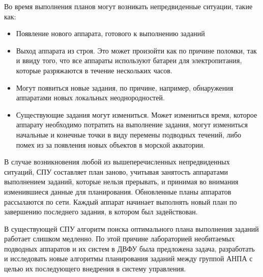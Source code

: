 \documentclass[a4paper,14pt,russian]{article}
\begin{document}
Во время выполнения планов могут возникать непредвиденные ситуации, такие как:
\begin{itemize}
\item Появление нового аппарата, готового к выполнению заданий
\item Выход аппарата из строя. Это может произойти как по причине поломки, так и ввиду того, что все аппараты используют батареи для электропитания, которые разряжаются в течение нескольких часов.
\item Могут появиться новые задания, по причине, например, обнаружения аппаратами новых локальных неоднородностей.
\item Существующие задания могут измениться. Может измениться время, которое аппарату необходимо потратить на выполнение задания, могут измениться начальные и конечные точки в виду перемены подводных течений, либо помех из за появления новых объектов в морской акватории.
\end{itemize}

В случае возникновения любой из вышеперечисленных непредвиденных ситуаций, СПУ составляет план заново, учитывая занятость аппаратами выполнением заданий, которые нельзя прерывать, и принимая во внимания изменившиеся данные для планирования. Обновленные планы аппаратов рассылаются по сети. Каждый аппарат начинает выполнять новый план по завершению последнего задания, в котором был задействован.

В существующей СПУ алгоритм поиска оптимального плана выполнения заданий работает слишком медленно. По этой причине лабораторией необитаемых подводных аппаратов и их систем в ДВФУ была предложена задача, разработать и исследовать новые алгоритмы планирования заданий между группой АНПА с целью их последующего внедрения в систему управления.





\end{document}
